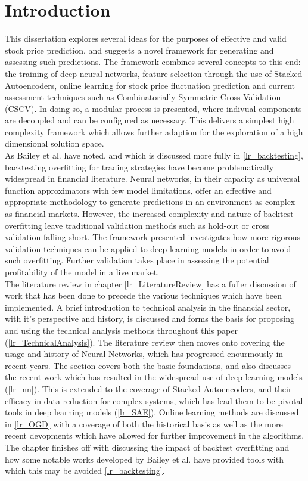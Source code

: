 \documentclass[a4paper,11pt,oneside]{article}
\theoremstyle{plain}
\theoremstyle{definition}
\begin{document}
	\section{Introduction}\label{Introduction}
	
	This dissertation explores several ideas for the purposes of effective and valid stock price prediction, and suggests a novel framework for generating and assessing such predictions. The framework combines several concepts to this end: the training of deep neural networks, feature selection through the use of Stacked Autoencoders, online learning for stock price fluctuation prediction and current assessment techniques such as Combinatorially Symmetric Cross-Validation (CSCV). In doing so, a modular process is presented, where indivual components are decoupled and can be configured as necessary. This delivers a simplest high complexity framework which allows further adaption for the exploration of a high dimensional solution space. 
	~\\\newline
	As Bailey et al. have noted, and which is discussed more fully in \ref{lr_backtesting}, backtesting overfitting for trading strategies have become problematically widespread in financial literature. Neural networks, in their capacity as universal function approximators with few model limitations, offer an effective and appropriate methodology to generate predictions in an environment as complex as financial markets. However, the increased complexity and nature of backtest overfitting leave traditional validation methods such as hold-out or cross validation falling short. The framework presented investigates how more rigorous validation techniques can be applied to deep learning models in order to avoid such overfitting. Further validation takes place in assessing the potential profitability of the model in a live market.
	~\\\newline
	The literature review in chapter \ref{lr_LiteratureReview} has a fuller discussion of work that has been done to precede the various techniques which have been implemented. A brief introduction to technical analysis in the financial sector, with it's perspective and history, is discussed and forms the basis for proposing and using the technical analysis methods throughout this paper (\ref{lr_TechnicalAnalysis}). The literature review then moves onto covering the usage and history of Neural Networks, which has progressed enourmously in recent years. The section covers both the basic foundations, and also discusses the recent work which has resulted in the widespread use of deep learning models (\ref{lr_nn}). This is extended to the coverage of Stacked Autoencoders, and their efficacy in data reduction for complex systems, which has lead them to be pivotal tools in deep learning models (\ref{lr_SAE}). Online learning methods are discussed in \ref{lr_OGD} with a coverage of both the historical basis as well as the more recent devopments which have allowed for further improvement in the algorithms. The chapter finishes off with discussing the impact of backtest overfitting and how some notable works developed by Bailey et al. have provided tools with which this may be avoided \ref{lr_backtesting}.
\end{document}
